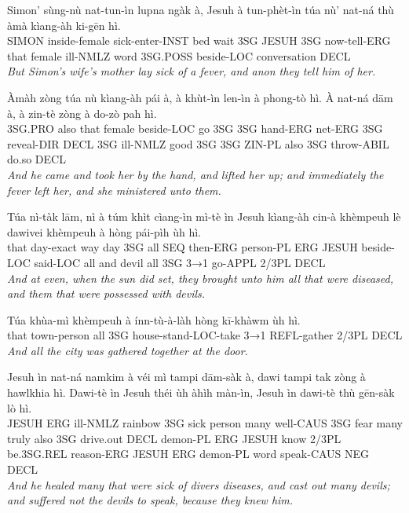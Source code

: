 \documentclass[11pt,a4paper]{article}
\begin{document}
\begin{exe}
\gll Simon' sùng-nù nat-tun-ìn lupna ngàk à, Jesuh à tun-phèt-ìn túa nù' nat-ná thù àmà kìang-àh ki-gēn hì. \\
     SIMON inside-female sick-enter-INST bed wait 3SG JESUH 3SG now-tell-ERG that female ill-NMLZ word 3SG.POSS beside-LOC conversation DECL \\
\glt \textcolor{kjvcolor}{\textit{But Simon's wife's mother lay sick of a fever, and anon they tell him of her.}}

\gll Àmàh zòng túa nù kìang-àh pái à, à khùt-ìn len-ìn à phong-tò hì. À nat-ná dām à, à zin-tè zòng à do-zò pah hì. \\
     3SG.PRO also that female beside-LOC go 3SG 3SG hand-ERG net-ERG 3SG reveal-DIR DECL 3SG ill-NMLZ good 3SG 3SG ZIN-PL also 3SG throw-ABIL do.so DECL \\
\glt \textcolor{kjvcolor}{\textit{And he came and took her by the hand, and lifted her up; and immediately the fever left her, and she ministered unto them.}}

\gll Túa nì-tàk lām, nì à túm khìt cìang-ìn mì-tè ìn Jesuh kìang-àh cin-à khèmpeuh lè dawivei khèmpeuh à hòng pái-pìh ùh hì. \\
     that day-exact way day 3SG all SEQ then-ERG person-PL ERG JESUH beside-LOC said-LOC all and devil all 3SG 3→1 go-APPL 2/3PL DECL \\
\glt \textcolor{kjvcolor}{\textit{And at even, when the sun did set, they brought unto him all that were diseased, and them that were possessed with devils.}}

\gll Túa khùa-mì khèmpeuh à ínn-tù-à-làh hòng kī-khàwm ùh hì. \\
     that town-person all 3SG house-stand-LOC-take 3→1 REFL-gather 2/3PL DECL \\
\glt \textcolor{kjvcolor}{\textit{And all the city was gathered together at the door.}}

\gll Jesuh ìn nat-ná namkim à véi mì tampi dām-sàk à, dawi tampi tak zòng à hawlkhia hì. Dawi-tè ìn Jesuh théi ùh àhìh màn-ìn, Jesuh ìn dawi-tè thù gēn-sàk lò hì. \\
     JESUH ERG ill-NMLZ rainbow 3SG sick person many well-CAUS 3SG fear many truly also 3SG drive.out DECL demon-PL ERG JESUH know 2/3PL be.3SG.REL reason-ERG JESUH ERG demon-PL word speak-CAUS NEG DECL \\
\glt \textcolor{kjvcolor}{\textit{And he healed many that were sick of divers diseases, and cast out many devils; and suffered not the devils to speak, because they knew him.}}


\end{exe}
\end{document}

